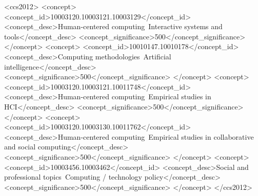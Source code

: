 \documentclass[manuscript, review, anonymous]{acmart}
\begin{document}
\title[]{}


\author{Alice Qian Zhang\textsuperscript{*}}

\author{Ryland Shaw}


\author{Jina Suh}

  
\author{Hong Shen}


    
\author{Laura Dabbish}


  \begin{CCSXML}
<ccs2012>
   <concept>
       <concept_id>10003120.10003121.10003129</concept_id>
       <concept_desc>Human-centered computing~Interactive systems and tools</concept_desc>
       <concept_significance>500</concept_significance>
       </concept>
   <concept>
       <concept_id>10010147.10010178</concept_id>
       <concept_desc>Computing methodologies~Artificial intelligence</concept_desc>
       <concept_significance>500</concept_significance>
       </concept>
   <concept>
       <concept_id>10003120.10003121.10011748</concept_id>
       <concept_desc>Human-centered computing~Empirical studies in HCI</concept_desc>
       <concept_significance>500</concept_significance>
       </concept>
   <concept>
       <concept_id>10003120.10003130.10011762</concept_id>
       <concept_desc>Human-centered computing~Empirical studies in collaborative and social computing</concept_desc>
       <concept_significance>500</concept_significance>
       </concept>
   <concept>
       <concept_id>10003456.10003462</concept_id>
       <concept_desc>Social and professional topics~Computing / technology policy</concept_desc>
       <concept_significance>500</concept_significance>
       </concept>
 </ccs2012>
\end{CCSXML}

\end{document}
